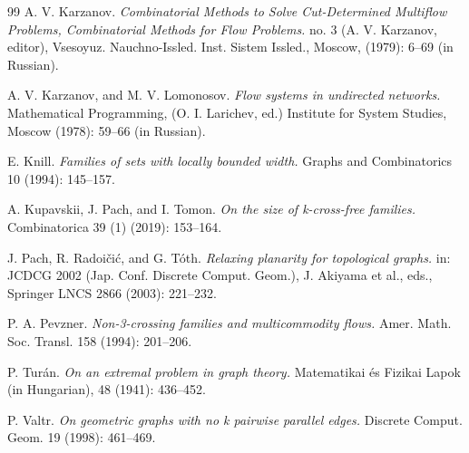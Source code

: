 \documentclass[11pt]{article}
\theoremstyle{definition}
\begin{document}
\begin{thebibliography}{99}
A. V. Karzanov.
\emph{Combinatorial Methods to Solve Cut-Determined Multiflow Problems, Combinatorial Methods for Flow Problems.} no. 3 (A. V. Karzanov, editor), Vsesoyuz. Nauchno-Issled. Inst. Sistem Issled., Moscow, (1979): 6--69 (in Russian).

A. V. Karzanov, and M. V. Lomonosov.
\emph{Flow systems in undirected networks.}
Mathematical Programming, (O. I. Larichev, ed.) Institute for System Studies, Moscow
(1978): 59--66 (in Russian).

E. Knill. 
\emph{Families of sets with locally bounded width.}
Graphs and Combinatorics 10 (1994): 145--157.

A. Kupavskii, J. Pach, and I. Tomon. 
\emph{On the size of k-cross-free families.} Combinatorica 39 (1) (2019): 153--164.

J. Pach, R. Radoi\v ci\'c, and G. T\'oth.
\emph{Relaxing planarity for topological graphs.}
in: JCDCG 2002 (Jap. Conf. Discrete Comput. Geom.), J. Akiyama et al., eds., Springer LNCS
2866 (2003): 221--232.

P. A. Pevzner.
\emph{Non-3-crossing families and multicommodity flows.}
Amer. Math. Soc. Transl. 158 (1994): 201--206.

P. Tur\'an.
\emph{On an extremal problem in graph theory.}
Matematikai \'es Fizikai Lapok (in Hungarian), 48 (1941): 436--452.

P. Valtr.
\emph{On geometric graphs with no k pairwise parallel edges.}
Discrete Comput. Geom. 19 (1998): 461--469.
\end{thebibliography}
\end{document}
